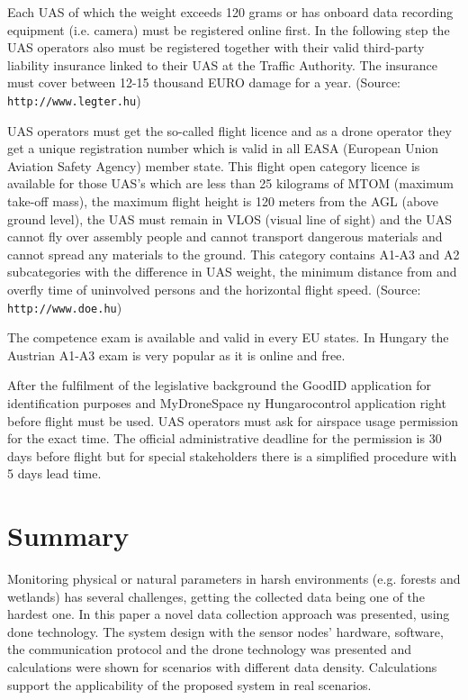 \documentclass[conference]{IEEEtran}
\begin{document}
Each UAS of which the weight exceeds 120 grams or has onboard data recording
equipment (i.e. camera) must be registered online first. In the following step
the UAS operators also must be registered together with their valid third-party
liability insurance linked to their UAS at the Traffic Authority. The insurance
must cover between 12-15 thousand EURO damage for a year. (Source: \texttt{http://www.legter.hu})

UAS operators must get the so-called flight licence and as a drone operator
they get a unique registration number which is valid in all EASA (European
Union Aviation Safety Agency) member state. This flight open category licence
is available for those UAS’s which are less than 25 kilograms of MTOM (maximum
take-off mass), the maximum flight height is 120 meters from the AGL (above
ground level), the UAS must remain in VLOS (visual line of sight) and the UAS
cannot fly over assembly people and cannot transport dangerous materials and
cannot spread any materials to the ground. This category contains A1-A3 and A2
subcategories with the difference in UAS weight, the minimum distance from and
overfly time of uninvolved persons and the horizontal flight speed.
(Source: \texttt{http://www.doe.hu})

The competence exam is available and valid in every EU states. In Hungary the
Austrian A1-A3 exam is very popular as it is online and free.

After the fulfilment of the legislative background the GoodID application for
identification purposes and MyDroneSpace ny Hungarocontrol application right
before flight must be used. UAS operators must ask for airspace usage
permission for the exact time. The official administrative deadline for the
permission is 30 days before flight but for special stakeholders there is a
simplified procedure with 5 days lead time.

\section{Summary}

Monitoring physical or natural parameters in harsh environments (e.g. forests and wetlands) has several
challenges, getting the collected data being one of the hardest one. In this paper a novel data
collection approach was presented, using done technology.
The system design with the sensor nodes' hardware, software,
the communication protocol and the drone technology was presented and
calculations were shown for scenarios with different data density.
Calculations support the applicability of the proposed system
in real scenarios.



\end{document}

